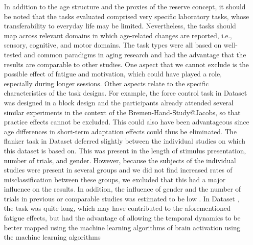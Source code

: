 In addition to the age structure and the proxies of the reserve concept, it should be noted that the tasks evaluated comprised very specific laboratory tasks, whose transferability to everyday life may be limited. Nevertheless, the tasks should map across relevant domains in which age-related changes are reported, i.e., sensory, cognitive, and motor domains. The task types were all based on well-tested and common paradigms in aging research and had the advantage that the results are comparable to other studies. One aspect that we cannot exclude is the possible effect of fatigue and motivation, which could have played a role, especially during longer sessions. Other aspects relate to the specific characteristics of the task designs. For example, the force control task in Dataset  was designed in a block design and the participants already attended several similar experiments in the context of the Bremen-Hand-Study@Jacobs, so that practice effects cannot be excluded. This could also have been advantageous since age differences in short-term adaptation effects could thus be eliminated. The flanker task in Dataset  deferred slightly between the individual studies on which this dataset is based on. This was present in the length of stimulus presentation, number of trials, and gender. However, because the subjects of the individual studies were present in several groups and we did not find increased rates of misclassification between these groups, we excluded that this had a major influence on the results. In addition, the influence of gender and the number of trials in previous or comparable studies was estimated to be low \cite{Reuter2019, Vahid2020}. In Dataset , the task was quite long, which may have contributed to the aforementioned fatigue effects, but had the advantage of allowing the temporal dynamics to be better mapped using the machine learning algorithms of brain activation using the machine learning algorithms 

